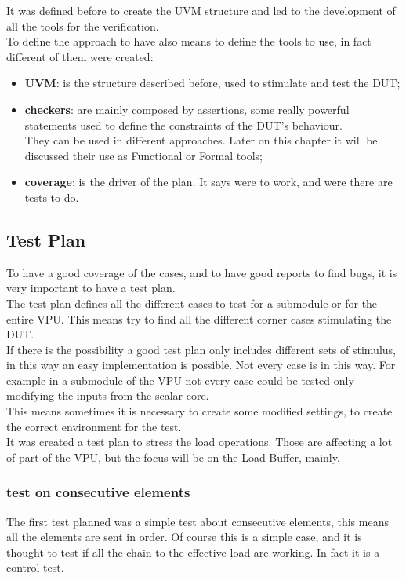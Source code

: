 It was defined before to create the UVM structure and led to the development of all the tools for the verification. \\
To define the approach to have also means to define the tools to use, in fact different of them were created:
\begin{itemize}
    \item \textbf{UVM}: is the structure described before, used to stimulate and test the DUT;
    
    \item \textbf{checkers}: are mainly composed by assertions, some really powerful statements used to define the constraints of the DUT's behaviour. \\
    They can be used in different approaches. Later on this chapter it will be discussed their use as Functional or Formal tools;
    
    \item \textbf{coverage}: is the driver of the plan. It says were to work, and were there are tests to do. 
    
\end{itemize}
\subsection{Test Plan}
To have a good coverage of the cases, and to have good reports to find bugs, it is very important to have a test plan.\\

The test plan defines all the different cases to test for a submodule or for the entire VPU. This means try to find all the different corner cases stimulating the DUT.\\

If there is the possibility a good test plan only includes different sets of stimulus, in this way an easy implementation is possible. Not every case is in this way. For example in a submodule of the VPU not every case could be tested only modifying the inputs from the scalar core.\\
This means sometimes it is necessary to create some modified settings, to create the correct environment for the test.\\

It was created a test plan to stress the load operations. Those are affecting a lot of part of the VPU, but the focus will be on the Load Buffer, mainly.\\

\subsubsection{test on consecutive elements}
The first test planned was a simple test about consecutive elements, this means all the elements are sent in order. Of course this is a simple case, and it is thought to test if all the chain to the effective load are working. In fact it is a control test.\\

